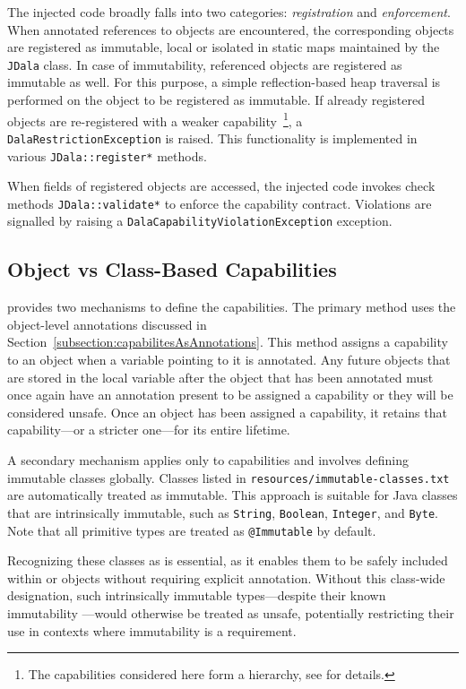 The injected code broadly falls into two categories: \textit{registration} and \textit{enforcement}. When annotated references to objects are encountered, the corresponding objects are registered as immutable, local or isolated in static maps maintained by the \texttt{JDala} class. In case of immutability, referenced objects are registered as immutable as well. For this purpose, a simple reflection-based heap traversal is performed on the object to be registered as immutable.  If already registered objects are re-registered with a weaker capability~\footnote{The capabilities considered here form a hierarchy, see \cite{Dala_Paper} for details.}, a \texttt{DalaRestrictionException} is raised.  This functionality is implemented in various \texttt{JDala::register*} methods.

When fields of registered objects are accessed, the injected code invokes check methods \texttt{JDala::validate*} to enforce the capability contract. Violations are signalled by raising a \texttt{DalaCapabilityViolationException} exception.


\subsection{Object vs Class-Based Capabilities}


\jdala provides two mechanisms to define the capabilities. The primary method uses the object-level annotations discussed in Section~\ref{subsection:capabilitesAsAnnotations}. This method assigns a capability to an object when a variable pointing to it is annotated. Any future objects that are stored in the local variable after the object that has been annotated must once again have an annotation present to be assigned a capability or they will be considered unsafe.
Once an object has been assigned a capability, it retains that capability—or a stricter one—for its entire lifetime.

A secondary mechanism applies only to \Immutable capabilities and involves defining immutable classes globally. Classes listed in \texttt{resources/immutable-classes.txt} are automatically treated as immutable. This approach is suitable for Java classes that are intrinsically immutable, such as \texttt{String}, \texttt{Boolean}, \texttt{Integer}, and \texttt{Byte}. Note that all primitive types are treated as \texttt{@Immutable} by default.

Recognizing these classes as \Immutable is essential, as it enables them to be safely included within \Local or \Isolated objects without requiring explicit annotation. Without this class-wide designation, such intrinsically immutable types—despite their known immutability —would otherwise be treated as unsafe, potentially restricting their use in contexts where immutability is a requirement.

